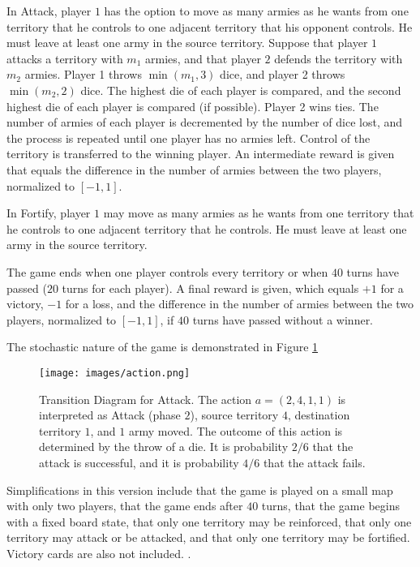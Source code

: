 \documentclass[final,5p,times,twocolumn]{elsarticle}
\begin{document}
In Attack, player $1$ has the option to move as many armies as he wants from one territory that he controls to one adjacent territory that his opponent controls. He must leave at least one army in the source territory. Suppose that player $1$ attacks a territory with $m_{1}$ armies, and that player $2$ defends the territory with $m_{2}$ armies. Player 1 throws $\min(m_{1}, 3)$ dice, and player 2 throws $\min(m_{2}, 2)$ dice. The highest die of each player is compared, and the second highest die of each player is compared (if possible). Player 2 wins ties. The number of armies of each player is decremented by the number of dice lost, and the process is repeated until one player has no armies left. Control of the territory is transferred to the winning player. An intermediate reward is given that equals the difference in the number of armies between the two players, normalized to $[-1, 1]$.

In Fortify, player $1$ may move as many armies as he wants from one territory that he controls to one adjacent territory that he controls. He must leave at least one army in the source territory.

The game ends when one player controls every territory or when $40$ turns have passed ($20$ turns for each player). A final reward is given, which equals $+1$ for a victory, $-1$ for a loss, and the difference in the number of armies between the two players, normalized to $[-1, 1]$, if $40$ turns have passed without a winner.

The stochastic nature of the game is demonstrated in Figure \ref{fig:action}

\begin{figure}[h!]
  \centering
  \texttt{[image: images/action.png]}
  \caption{Transition Diagram for Attack. The action $a = (2, 4, 1, 1)$ is interpreted as Attack (phase $2$), source territory $4$, destination territory $1$, and $1$ army moved. The outcome of this action is determined by the throw of a die. It is probability $2/6$ that the attack is successful, and it is probability $4/6$ that the attack fails.}
  \label{fig:action}
\end{figure}

Simplifications in this version include that the game is played on a small map with only two players, that the game ends after $40$ turns, that the game begins with a fixed board state, that only one territory may be reinforced, that only one territory may attack or be attacked, and that only one territory may be fortified. Victory cards are also not included. \cite{risk1959}.
\end{document}
